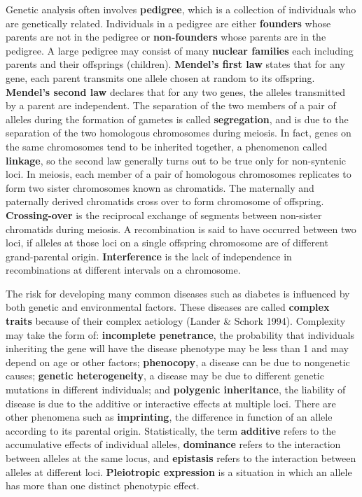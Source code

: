 Genetic analysis often involves {\bf pedigree}, which is a collection of
individuals who are genetically related.  Individuals in a pedigree are either
{\bf founders} whose parents are not in the pedigree or {\bf non-founders}
whose parents are in the pedigree.  A large pedigree may consist of many {\bf
nuclear families} each including parents and their offsprings (children).  {\bf
Mendel's first law} states that for any gene, each parent transmits one allele
chosen at random to its offspring.  {\bf Mendel's second law} declares that for
any two genes, the alleles transmitted by a parent are independent.  The
separation of the two members of a pair of alleles during the formation of
gametes is called {\bf segregation}, and is due to the separation of the two
homologous chromosomes during meiosis.  In fact, genes on the same chromosomes
tend to be inherited together, a phenomenon called {\bf linkage}, so the second
law generally turns out to be true only for non-syntenic loci.  In meiosis,
each member of a pair of homologous chromosomes replicates to form two sister
chromosomes known as chromatids.  The maternally and paternally derived
chromatids cross over to form chromosome of offspring.  {\bf Crossing-over} is
the reciprocal exchange of segments between non-sister chromatids during
meiosis.  A recombination is said to have occurred between two loci, if alleles
at those loci on a single offspring chromosome are of different grand-parental
origin.  {\bf Interference} is the lack of independence in recombinations at
different intervals on a chromosome.

The risk for developing many common diseases such as diabetes is influenced by
both genetic and environmental factors.  These diseases are called {\bf complex
traits} because of their complex aetiology (Lander \& Schork 1994).  Complexity
may take the form of:  {\bf incomplete penetrance}, the probability that
individuals inheriting the gene will have the disease phenotype may be less
than 1 and may depend on age or other factors; {\bf phenocopy}, a disease can
be due to nongenetic causes; {\bf genetic heterogeneity}, a disease may be due
to different genetic mutations in different individuals; and {\bf polygenic
inheritance}, the liability of disease is due to the additive or interactive
effects at multiple loci.  There are other phenomena such as {\bf imprinting},
the difference in function of an allele according to its parental origin.
Statistically, the term {\bf additive} refers to the accumulative effects of
individual alleles, {\bf dominance} refers to the interaction between alleles
at the same locus, and {\bf epistasis} refers to the interaction between
alleles at different loci.  {\bf Pleiotropic expression} is a situation in
which an allele has more than one distinct phenotypic effect.

